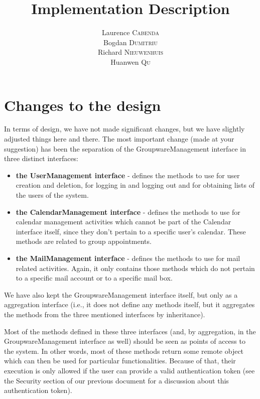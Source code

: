 \documentclass[a4paper,10pt]{article}
\title{Implementation Description}
\author{Laurence \textsc{Cabenda}\\Bogdan \textsc{Dumitriu}\\Richard \textsc{Nieuwenhuis}\\Huanwen \textsc{Qu}}
\begin{document}
\maketitle

\section{Changes to the design}

In terms of design, we have not made significant changes, but we have slightly adjusted
things here and there. The most important change (made at your suggestion) has been the
separation of the GroupwareManagement interface in three distinct interfaces:

\begin{itemize}

\item \textbf{the UserManagement interface} - defines the methods to use for user creation
and deletion, for logging in and logging out and for obtaining lists of the users of the system.

\item \textbf{the CalendarManagement interface} - defines the methods to use for calendar
management activities which cannot be part of the Calendar interface itself, since they
don't pertain to a specific user's calendar. These methods are related to group appointments.

\item \textbf{the MailManagement interface} - defines the methods to use for mail related
activities. Again, it only contains those methods which do not pertain to a specific mail
account or to a specific mail box.

\end{itemize}

We have also kept the GroupwareManagement interface itself, but only as a aggregation
interface (i.e., it does not define any methods itself, but it aggregates the methods from
the three mentioned interfaces by inheritance).

Most of the methods defined in these three interfaces (and, by aggregation, in the
GroupwareManagement interface as well) should be seen as points of access to the
system. In other words, most of these methods return some remote object which can
then be used for particular functionalities. Because of that, their execution is only allowed
if the user can provide a valid authentication token (see the Security section of our
previous document for a discussion about this authentication token).
\end{document}
